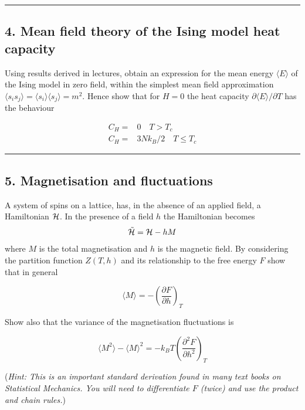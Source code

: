 \documentclass[
  letterpaper,
  DIV=11,
  numbers=noendperiod]{scrreprt}
\begin{document}
\begin{center}\rule{0.5\linewidth}{0.5pt}\end{center}

\subsection*{4. Mean field theory of the Ising model heat
capacity}\label{mean-field-theory-of-the-ising-model-heat-capacity}

Using results derived in lectures, obtain an expression for the mean
energy \(\langle E\rangle\) of the Ising model in zero field, within the
simplest mean field approximation \(\langle
  s_is_j\rangle=\langle s_i\rangle\langle s_j\rangle=m^2\). Hence show
that for \(H=0\) the heat capacity
\(\partial \langle E\rangle/\partial T\) has the behaviour

\begin{align}
C_H=& 0 \quad T>T_c\\
C_H=& 3Nk_B/2 \quad T\le T_c
\end{align}

\begin{center}\rule{0.5\linewidth}{0.5pt}\end{center}

\subsection*{5. Magnetisation and
fluctuations}\label{magnetisation-and-fluctuations}

A system of spins on a lattice, has, in the absence of an applied field,
a Hamiltonian \({\cal H}\). In the presence of a field \(h\) the
Hamiltonian becomes \[
\tilde {\cal H}={\cal H}-hM
\] where \(M\) is the total magnetisation and \(h\) is the magnetic
field. By considering the partition function \(Z(T,h)\) and its
relationship to the free energy \(F\) show that in general

\[
\langle M \rangle=-\left(\frac{\partial F}{\partial h}\right)_T
\]

Show also that the variance of the magnetisation fluctuations is

\[\langle M^2\rangle-\langle M\rangle^2=-k_BT\left(\frac{\partial^2 F}{\partial h^2}\right)_T\]

(\emph{Hint: This is an important standard derivation found in many text
books on Statistical Mechanics. You will need to differentiate \(F\)
(twice) and use the product and chain rules.})
\end{document}
